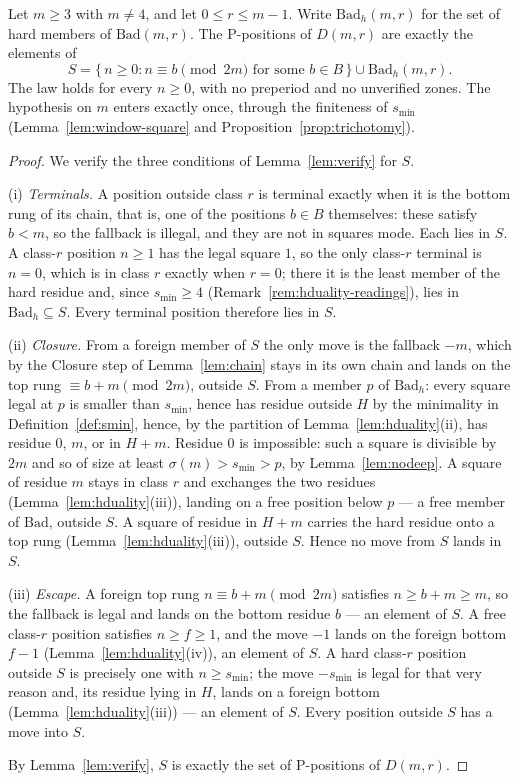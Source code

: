 \begin{theorem}\label{thm:main}
Let $m \ge 3$ with $m \ne 4$, and let $0 \le r \le m-1$. Write
$\mathrm{Bad}_h(m,r)$ for the set of hard members of
$\mathrm{Bad}(m,r)$. The P-positions of $D(m,r)$ are exactly the elements
of
\[ S = \{\, n \ge 0 : n \equiv b \pmod{2m} \text{ for some } b \in B \,\}
\cup \mathrm{Bad}_h(m,r). \]
The law holds for every $n \ge 0$, with no preperiod and no unverified
zones. The hypothesis on $m$ enters exactly once, through the finiteness
of $s_{\min}$ (Lemma~\ref{lem:window-square} and
Proposition~\ref{prop:trichotomy}).
\end{theorem}
\begin{proof}
We verify the three conditions of Lemma~\ref{lem:verify} for $S$.

(i) \emph{Terminals.} A position outside class $r$ is terminal exactly
when it is the bottom rung of its chain, that is, one of the positions
$b \in B$ themselves: these satisfy $b < m$, so the fallback is illegal,
and they are not in squares mode. Each lies in $S$. A class-$r$ position
$n \ge 1$ has the legal square $1$, so the only class-$r$ terminal is
$n = 0$, which is in class $r$ exactly when $r = 0$; there it is the
least member of the hard residue and, since $s_{\min} \ge 4$
(Remark~\ref{rem:hduality-readings}), lies in
$\mathrm{Bad}_h \subseteq S$. Every terminal position therefore lies in
$S$.

(ii) \emph{Closure.} From a foreign member of $S$ the only move is the
fallback $-m$, which by the Closure step of Lemma~\ref{lem:chain} stays
in its own chain and lands on the top rung $\equiv b + m \pmod{2m}$,
outside $S$. From a member $p$ of $\mathrm{Bad}_h$: every square legal at
$p$ is smaller than $s_{\min}$, hence has residue outside $H$ by the
minimality in Definition~\ref{def:smin}, hence, by the partition of
Lemma~\ref{lem:hduality}(ii), has residue $0$, $m$, or in $H + m$.
Residue $0$ is impossible: such a square is divisible by $2m$ and so of
size at least $\sigma(m) > s_{\min} > p$, by Lemma~\ref{lem:nodeep}. A
square of residue $m$ stays in class $r$ and exchanges the two residues
(Lemma~\ref{lem:hduality}(iii)), landing on a free position below $p$ ---
a free member of $\mathrm{Bad}$, outside $S$. A square of residue in
$H + m$ carries the hard residue onto a top rung
(Lemma~\ref{lem:hduality}(iii)), outside $S$. Hence no move from $S$
lands in $S$.

(iii) \emph{Escape.} A foreign top rung $n \equiv b + m \pmod{2m}$
satisfies $n \ge b + m \ge m$, so the fallback is legal and lands on the
bottom residue $b$ --- an element of $S$. A free class-$r$ position
satisfies $n \ge f \ge 1$, and the move $-1$ lands on the foreign bottom
$f - 1$ (Lemma~\ref{lem:hduality}(iv)), an element of $S$. A hard
class-$r$ position outside $S$ is precisely one with $n \ge s_{\min}$;
the move $-s_{\min}$ is legal for that very reason and, its residue lying
in $H$, lands on a foreign bottom (Lemma~\ref{lem:hduality}(iii)) --- an
element of $S$. Every position outside $S$ has a move into $S$.

By Lemma~\ref{lem:verify}, $S$ is exactly the set of P-positions of
$D(m,r)$.
\end{proof}


